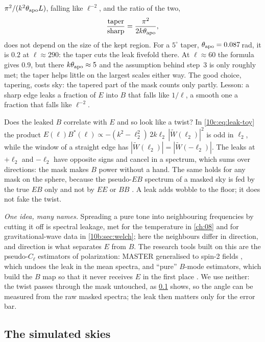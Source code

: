 $\pi^2/(k^2\theta_{\rm apo}L)$, falling like $\ell^{-2}$, and the ratio of the two,
\begin{equation}
  \frac{\text{taper}}{\text{sharp}}=\frac{\pi^2}{2k\theta_{\rm apo}},
  \label{10c:eq:leak-ratio}
\end{equation}
does not depend on the size of the kept region. For a $5^\circ$ taper, $\theta_{\rm apo}=0.087$\,rad, it is $0.2$ at
$\ell\approx290$: the taper cuts the leak fivefold there. At $\ell\approx60$ the formula gives $0.9$, but there
$k\theta_{\rm apo}\approx5$ and the assumption behind step~3 is only roughly met; the taper helps little on the
largest scales either way. The good choice, tapering, costs sky: the tapered part of the mask counts only partly.
Lesson: a sharp edge leaks a fraction of $E$ into $B$ that falls like $1/\ell$, a smooth one a fraction that falls
like $\ell^{-2}$.

Does the leaked $B$ correlate with $E$ and so look like a twist? In \eqref{10c:eq:leak-toy} the product
$E(\bm\ell)B^*(\bm\ell)\propto-(k^2-\ell_2^2)\,2k\ell_2\,|\widetilde W(\ell_2)|^2$ is odd in $\ell_2$, while the window of a straight
edge has $|\widetilde W(\ell_2)|=|\widetilde W(-\ell_2)|$. The leaks at $+\ell_2$ and $-\ell_2$ have opposite signs and cancel in a
spectrum, which sums over directions: the mask makes $B$ power without a hand. The same holds for any mask on the
sphere, because the pseudo-$EB$ spectrum of a masked sky is fed by the true $EB$ only and not by $EE$ or $BB$
\cite{Alonso2019}. A leak adds wobble to the floor; it does not fake the twist.

\emph{One idea, many names.} Spreading a pure tone into neighbouring frequencies by cutting it off is spectral
leakage, met for the temperature in \cref{ch:08} and for gravitational-wave data in \cref{10b:sec:welch}; here the
neighbours differ in direction, and direction is what separates $E$ from $B$. The research tools built on this are
the pseudo-$C_\ell$ estimators of polarization: MASTER generalised to spin-2 fields \cite{Hivon2002,Alonso2019}, which
undoes the leak in the mean spectra, and ``pure'' $B$-mode estimators, which build the $B$ map so that it never
receives $E$ in the first place \cite{SmithPureB2006}. We use neither: the twist passes through the mask untouched,
as \cref{10c:sec:mc-sims} shows, so the angle can be measured from the raw masked spectra; the leak then matters only for the
error bar.

\subsection{The simulated skies}
\label{10c:sec:mc-sims}

